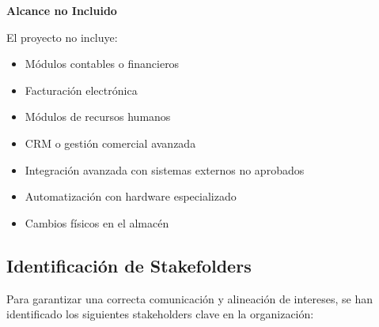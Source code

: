 \documentclass[11pt, a4paper, oneside]{report}
\begin{document}
\textbf{Alcance no Incluido}

El proyecto no incluye:

\begin{itemize}
    \item Módulos contables o financieros
    \item Facturación electrónica
    \item Módulos de recursos humanos
    \item CRM o gestión comercial avanzada
    \item Integración avanzada con sistemas externos no aprobados
    \item Automatización con hardware especializado
    \item Cambios físicos en el almacén
\end{itemize}

\subsection{Identificación de Stakefolders}
Para garantizar una correcta comunicación y alineación de intereses, se han identificado los siguientes stakeholders clave en la organización:
\end{document}
